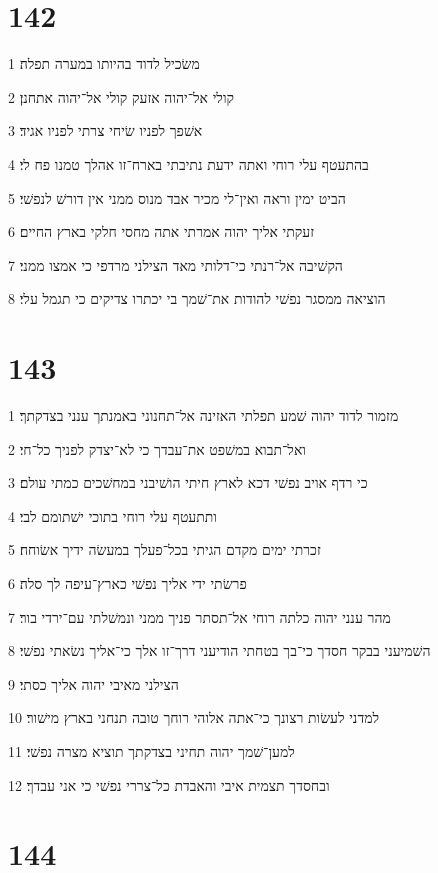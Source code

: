 \chapter{142}

\par 1 משׂכיל לדוד בהיותו במערה תפלה׃
\par 2 קולי אל־יהוה אזעק קולי אל־יהוה אתחנן׃
\par 3 אשׁפך לפניו שׂיחי צרתי לפניו אגיד׃
\par 4 בהתעטף עלי רוחי ואתה ידעת נתיבתי בארח־זו אהלך טמנו פח לי׃
\par 5 הביט ימין וראה ואין־לי מכיר אבד מנוס ממני אין דורשׁ לנפשׁי׃
\par 6 זעקתי אליך יהוה אמרתי אתה מחסי חלקי בארץ החיים׃
\par 7 הקשׁיבה אל־רנתי כי־דלותי מאד הצילני מרדפי כי אמצו ממני׃
\par 8 הוציאה ממסגר נפשׁי להודות את־שׁמך בי יכתרו צדיקים כי תגמל עלי׃

\chapter{143}

\par 1 מזמור לדוד יהוה שׁמע תפלתי האזינה אל־תחנוני באמנתך ענני בצדקתך׃
\par 2 ואל־תבוא במשׁפט את־עבדך כי לא־יצדק לפניך כל־חי׃
\par 3 כי רדף אויב נפשׁי דכא לארץ חיתי הושׁיבני במחשׁכים כמתי עולם׃
\par 4 ותתעטף עלי רוחי בתוכי ישׁתומם לבי׃
\par 5 זכרתי ימים מקדם הגיתי בכל־פעלך במעשׂה ידיך אשׂוחח׃
\par 6 פרשׂתי ידי אליך נפשׁי כארץ־עיפה לך סלה׃
\par 7 מהר ענני יהוה כלתה רוחי אל־תסתר פניך ממני ונמשׁלתי עם־ירדי בור׃
\par 8 השׁמיעני בבקר חסדך כי־בך בטחתי הודיעני דרך־זו אלך כי־אליך נשׂאתי נפשׁי׃
\par 9 הצילני מאיבי יהוה אליך כסתי׃
\par 10 למדני לעשׂות רצונך כי־אתה אלוהי רוחך טובה תנחני בארץ מישׁור׃
\par 11 למען־שׁמך יהוה תחיני בצדקתך תוציא מצרה נפשׁי׃
\par 12 ובחסדך תצמית איבי והאבדת כל־צררי נפשׁי כי אני עבדך׃

\chapter{144}

